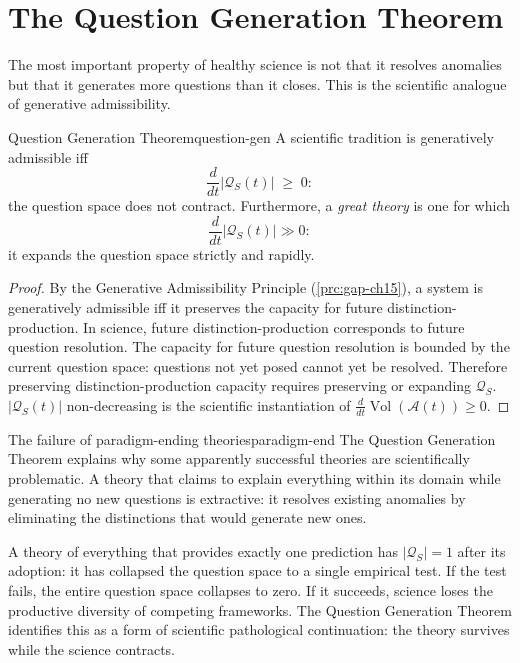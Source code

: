 \documentclass[12pt,twoside,openright]{book}
\newcommand{\adm}{\mathcal{A}}
\newcommand{\Vol}{\operatorname{Vol}}
\begin{document}
\section{The Question Generation Theorem}

The most important property of healthy science is not
that it resolves anomalies but that it generates more
questions than it closes. This is the scientific
analogue of generative admissibility.

\begin{theorem}{Question Generation Theorem}{question-gen}
  A scientific tradition is generatively admissible iff
  \[
    \frac{d}{dt}|\mathcal{Q}_S(t)| \;\ge\; 0:
  \]
  the question space does not contract.
  Furthermore, a \emph{great theory} is one for which
  \[
    \frac{d}{dt}|\mathcal{Q}_S(t)| \gg 0:
  \]
  it expands the question space strictly and rapidly.
\end{theorem}

\begin{proof}
  By the Generative Admissibility Principle
  (\cref{prc:gap-ch15}), a system is generatively
  admissible iff it preserves the capacity for future
  distinction-production.
  In science, future distinction-production corresponds
  to future question resolution.
  The capacity for future question resolution is bounded
  by the current question space: questions not yet
  posed cannot yet be resolved.
  Therefore preserving distinction-production capacity
  requires preserving or expanding $\mathcal{Q}_S$.
  $|\mathcal{Q}_S(t)|$ non-decreasing is the
  scientific instantiation of
  $\frac{d}{dt}\Vol(\adm(t)) \ge 0$.
\end{proof}

\begin{remark}{The failure of paradigm-ending theories}{paradigm-end}
  The Question Generation Theorem explains why some
  apparently successful theories are scientifically
  problematic. A theory that claims to explain
  everything within its domain while generating no
  new questions is extractive: it resolves existing
  anomalies by eliminating the distinctions that
  would generate new ones.

  A theory of everything that provides exactly one
  prediction has $|\mathcal{Q}_S| = 1$ after
  its adoption: it has collapsed the question space
  to a single empirical test. If the test fails,
  the entire question space collapses to zero.
  If it succeeds, science loses the productive
  diversity of competing frameworks.
  The Question Generation Theorem identifies this
  as a form of scientific pathological continuation:
  the theory survives while the science contracts.
\end{remark}
\end{document}
